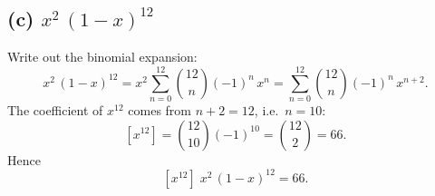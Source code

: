 \documentclass[docmute]{article}
\begin{document}
\subsection*{(c) \(x^2\,(1 - x)^{12}\)}  
Write out the binomial expansion:
\[
x^2\,(1 - x)^{12}
= x^2\sum_{n=0}^{12} \binom{12}{n}(-1)^n\,x^n
= \sum_{n=0}^{12} \binom{12}{n}(-1)^n\,x^{n+2}.
\]
The coefficient of \(x^{12}\) comes from \(n+2=12\), i.e.\ \(n=10\):
\[
[x^{12}] = \binom{12}{10}(-1)^{10}
= \binom{12}{2}
= 66.
\]
Hence
\[
\boxed{
[x^{12}]\;x^2\,(1 - x)^{12} = 66.
}
\]
\end{document}
